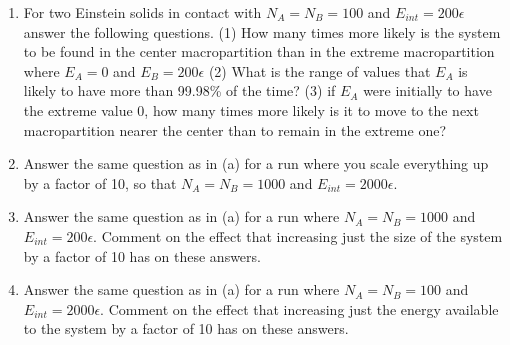 \begin{enumerate}
\begin{enumerate}
\item For two Einstein solids in contact with 
$N_A = N_B = 100$ and 
$E_{int} = 200\epsilon$ answer the following questions.  (1) How many times more likely is the system 
to be found in the center macropartition than in the extreme macropartition where $E_A = 0$ 
and $E_B = 200\epsilon$ 
(2) What is the range of values that $E_A$ is likely to have more than 99.98\% 
of the time?  (3) if $E_A$ were initially to have the extreme value 0, how many times more 
likely is it to move to the next macropartition nearer the center than to remain in the 
extreme one?
\item  Answer the same question as in (a) for a run where you scale everything up by a 
factor of 10, so that $N_A = N_B = 1000$ and $E_{int} = 2000\epsilon$.
\item  Answer the same question as in (a) for a run where $N_A = N_B = 1000$ and 
$E_{int} = 200\epsilon$.  
Comment on the effect that increasing just the size of the system by a factor of 10 
has on these answers.
\item Answer the same question as in (a) for a run where $N_A = N_B = 100$ and $E_{int} = 2000\epsilon$.  
Comment on the effect that increasing just the energy available to the system by a factor 
of 10 has on these answers.

\end{enumerate}


\end{enumerate}
